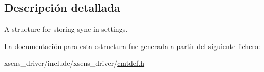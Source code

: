 \subsection{\-Descripción detallada}
\-A structure for storing sync in settings. 

\-La documentación para esta estructura fue generada a partir del siguiente fichero\-:\begin{DoxyCompactItemize}
\item 
xsens\-\_\-driver/include/xsens\-\_\-driver/\hyperlink{cmtdef_8h}{cmtdef.\-h}\end{DoxyCompactItemize}
